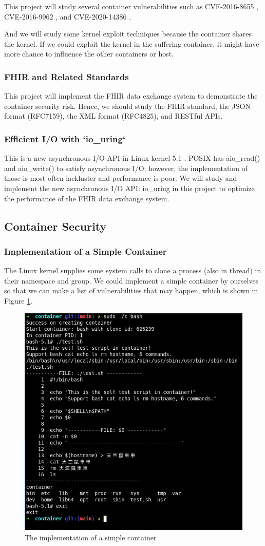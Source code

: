\documentclass[12pt,a4paper]{article}
\begin{document}
This project will study several container vulnerabilities such as CVE-2016-8655
\cite{CVE-2016-8655}, CVE-2016-9962 \cite{CVE-2016-9962}, and CVE-2020-14386 \cite{CVE-2020-14386}.

And we will study some kernel exploit techniques \cite{Kernel_exploitation} because the container shares
the kernel. If we could exploit the kernel in the suffering container, it might have more chance
to influence the other containers or host.

\subsubsection{FHIR and Related Standards}
This project will implement the FHIR \cite{FHIR_home} data exchange system to demonstrate the container
security risk. Hence, we should study the FHIR standard, the JSON format (RFC7159), the XML format
(RFC4825), and RESTful APIs.

\subsubsection{Efficient I/O with `io\_uring`}
This is a new asynchronous I/O API in Linux kernel 5.1 \cite{Efficient_IO_uring}. POSIX has
aio\_read() and aio\_write() to satisfy asynchronous I/O; however, the implementation of those
is most often lackluster and performance is poor. We will study and implement the new asynchronous
I/O API: io\_uring in this project to optimize the performance of the FHIR data exchange system.

\subsection{Container Security}
\subsubsection{Implementation of a Simple Container}
The Linux kernel supplies some system calls to clone a process (also in thread) in their namespace
and group. We could implement a simple container by ourselves so that we can make a list of
vulnerabilities that may happen, which is shown in Figure \ref*{Fig:sc}.

\begin{figure}
  \includegraphics[width=.5\textwidth]{Screenshot from 2021-02-09 19-45-29.png}
  \caption{The implementation of a simple container}
  \label{Fig:sc}
\end{figure}
\end{document}
